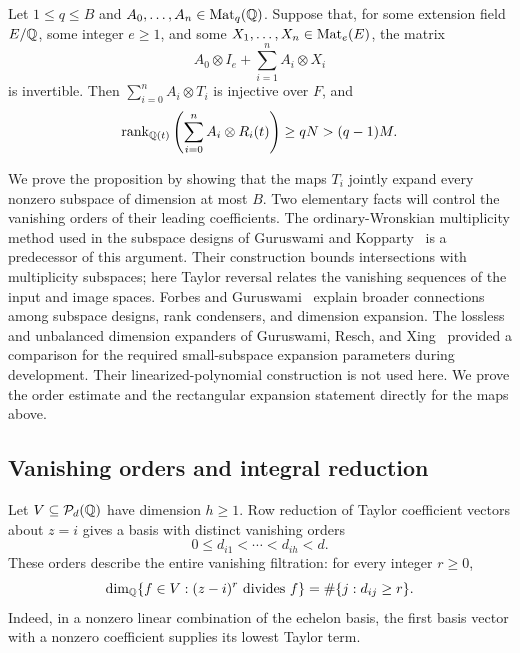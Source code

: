 \begin{proposition}
\label{prop:rectangular}
Let $1\leq q\leq B$ and $A_0,\ldots,A_n\in\operatorname{Mat}_q(\mathbb Q)$.  Suppose that,
for some extension field $E/\mathbb Q$, some integer $e\geq1$, and some
$X_1,\ldots,X_n\in\operatorname{Mat}_e(E)$, the matrix
\[
  A_0\otimes I_e+\sum_{i=1}^n A_i\otimes X_i
\]
is invertible.  Then $\sum_{i=0}^n A_i\otimes T_i$ is injective over $F$,
and
\begin{equation}
  \operatorname{rank}_{\mathbb Q(t)}\left(\sum_{i=0}^n A_i\otimes R_i(t)\right)
  \geq qN>(q-1)M.
  \label{eq:padded-rank}
\end{equation}
\end{proposition}

We prove the proposition by showing that the maps $T_i$ jointly expand
every nonzero subspace of dimension at most $B$.  Two elementary facts will
control the vanishing orders of their leading coefficients.
The ordinary-Wronskian multiplicity method used in the subspace designs
of Guruswami and Kopparty~\citep[Section~5.1 of the preprint]{GK16}
is a predecessor of this argument. Their construction bounds
intersections with multiplicity subspaces; here Taylor reversal
relates the vanishing sequences of the input and image spaces.
Forbes and Guruswami~\citep{FG15} explain broader connections among
subspace designs, rank condensers, and dimension expansion.
The lossless and unbalanced dimension expanders of Guruswami, Resch,
and Xing~\citep{GRX18} provided a comparison for the required
small-subspace expansion parameters during development.  Their
linearized-polynomial construction is not used here.
We prove the order estimate and the rectangular expansion statement
directly for the maps above.

\subsection{Vanishing orders and integral reduction}

Let $V\subseteq\mathcal P_d(\mathbb Q)$ have dimension $h\geq1$.  Row reduction
of Taylor coefficient vectors about $z=i$ gives a basis with distinct
vanishing orders
\[
  0\leq d_{i1}<\cdots<d_{ih}<d.
\]
These orders describe the entire vanishing filtration: for every integer
$r\geq0$,
\begin{equation}
  \dim_{\mathbb Q}\{f\in V:(z-i)^r\text{ divides }f\}
  =\#\{j:d_{ij}\geq r\}.
  \label{eq:vanishing-filtration}
\end{equation}
Indeed, in a nonzero linear combination of the echelon basis, the first
basis vector with a nonzero coefficient supplies its lowest Taylor term.

